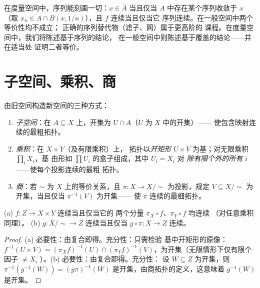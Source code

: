 \begin{remark}\label{rem:b3:topology:sequences}
在度量空间中，序列能刻画一切：$x \in \bar A$
当且仅当 $A$ 中存在某个序列收敛于 $x$（取 $x_n \in A \cap
B(x, 1/n)$），且 $f$ 连续当且仅当它
序列连续。在一般空间中两个等价性均不成立；
正确的序列替代物（滤子、网）属于更高阶的
课程。在度量空间中，我们将陈述基于序列的结论，
在一般空间中则陈述基于覆盖的结论——并在适当处
证明二者等价。
\end{remark}

\section{子空间、乘积、商}

\begin{definition}\label{def:b3:topology:constructions}
由旧空间构造新空间的三种方式：
\begin{enumerate}
  \item \emph{子空间}：在 $A \subseteq X$ 上，开集为
        $U \cap A$（$U$ 为 $X$ 中的开集）——
        使包含映射连续的最粗拓扑。
  \item \emph{乘积}：在 $X \times Y$（及有限乘积）上，
        拓扑以\emph{开矩形} $U \times
        V$ 为基；对无限乘积 $\prod_i X_i$，基
        由形如 $\prod U_i$ 的盒子组成，其中 $U_i = X_i$ 对
        \emph{除有限个外的所有} $i$ ——使每个投影连续的最粗
        拓扑。
  \item \emph{商}：若 $\sim$ 为 $X$ 上的等价关系，且
        $\pi\colon X \to X/{\sim}$ 为投影，规定 $V
        \subseteq X/{\sim}$ 为开集，当且仅当 $\pi^{-1}(V)$ 为开集——
        使 $\pi$ 连续的最细拓扑。
\end{enumerate}
\end{definition}

\begin{proposition}[泛性质]
\label{prop:b3:topology:universal}
(a) $f \colon Z \to X \times Y$ 连续当且仅当它的
两个分量 $\pi_X \circ f$、$\pi_Y \circ f$ 均连续
（对任意乘积同理）。
(b) $g \colon X/{\sim} \to Z$ 连续当且仅当 $g \circ \pi
\colon X \to Z$ 连续。
\end{proposition}

\begin{proof}
(a) 必要性：由复合即得。充分性：只需检验
基中开矩形的原像：$f^{-1}(U \times V) = (\pi_Xf)^{-1}(U)
\cap (\pi_Yf)^{-1}(V)$，为开集（无限情形下仅有限个因子 $\neq X_i$
）。(b) 必要性：由复合即得。充分性：
设 $W \subseteq Z$ 为开集，则 $\pi^{-1}(g^{-1}(W)) = (g\pi)^{-1}(W)$
是开集，由商拓扑的定义，这意味着
$g^{-1}(W)$ 是开集。
\end{proof}

